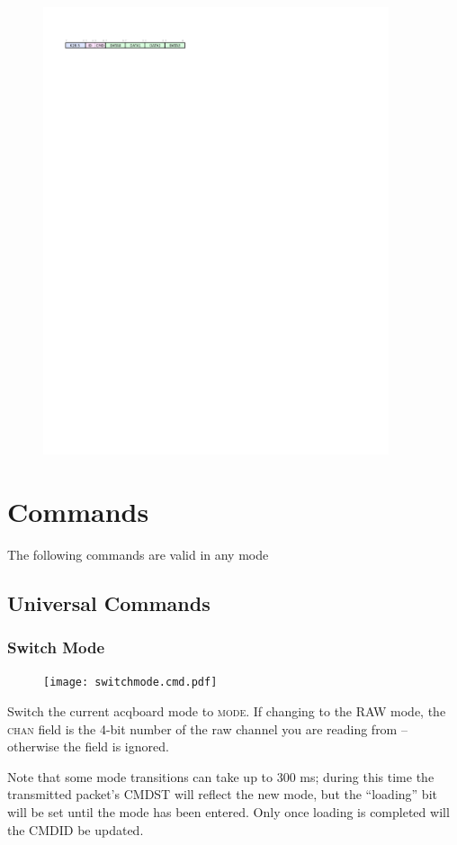 \begin{figure}[h!]
\includegraphics[width=4in]{rxpacket}
\end{figure}

\section{Commands}

The following commands are valid in any mode

\subsection{Universal Commands}

\subsubsection{Switch Mode}
\begin{figure}[h!]
\texttt{[image: switchmode.cmd.pdf]}
\end{figure}

Switch the current acqboard mode to \textsc{mode}. If changing to the RAW mode, the \textsc{chan} field is the 4-bit number of the raw channel you are reading from -- otherwise the field is ignored. 

Note that some mode transitions can take up to 300 ms; during this time the transmitted packet's CMDST will reflect the new mode, but the ``loading'' bit will be set until the mode has been entered. Only once loading is completed will the CMDID be updated. 

